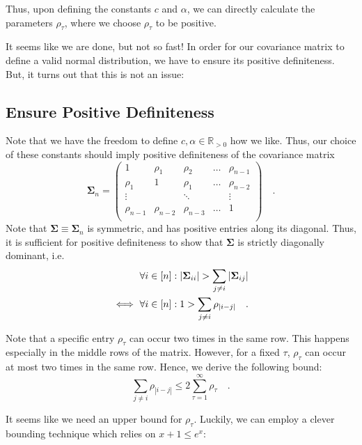 \documentclass[../../main.tex]{subfiles}
\begin{document}
Thus, upon defining the constants $c$ and $\alpha$, we can directly calculate the parameters $\rho_\tau$, where we choose $\rho_\tau$ to be positive.

It seems like we are done, but not so fast! In order for our covariance matrix to define a valid normal distribution, we have to ensure its positive definiteness. But, it turns out that this is not an issue:

\subsection{Ensure Positive Definiteness}
Note that we have the freedom to define $c, \alpha \in \mathbb{R}_{>0}$ how we like. Thus, our choice of these constants should imply positive definiteness of the covariance matrix
\[
    \bm{\Sigma}_n = \begin{pmatrix*}
        1& \rho_1& \rho_2& \dots & \rho_{n-1} \\
        \rho_1& 1& \rho_1& \dots & \rho_{n-2} \\
        \vdots &  & \ddots & & \vdots \\
        \rho_{n-1} & \rho_{n-2} & \rho_{n-3} & \dots & 1 \\
    \end{pmatrix*}
    \quad .
\]
Note that $\bm{\Sigma} \equiv \bm{\Sigma}_n$ is symmetric, and has positive entries along its diagonal. Thus, it is sufficient for positive definiteness to show that $\bm{\Sigma}$ is strictly diagonally dominant, i.e.
\begin{align}
    &\forall i \in [n]: |\bm{\Sigma}_{ii}| > \sum_{j \neq i} |\bm{\Sigma}_{ij}| \notag \\
    \iff \ &\forall i \in [n]: 1 > \sum_{j \neq i} \rho_{|i-j|} \quad . \label{eq:diagonal_dominant}
\end{align}

Note that a specific entry $\rho_\tau$ can occur two times in the same row. This happens especially in the middle rows of the matrix. However, for a fixed $\tau$, $\rho_\tau$ can occur at most two times in the same row. Hence, we derive the following bound:
\begin{equation}
    \sum_{j \neq i} \rho_{|i-j|} \leq 2 \sum_{\tau = 1}^{\infty} \rho_\tau \quad . \label{eq:diagonal_dominant_sufficient}
\end{equation}

It seems like we need an upper bound for $\rho_\tau$. Luckily, we can employ a clever bounding technique which relies on $x + 1 \leq e^x$:
\end{document}
